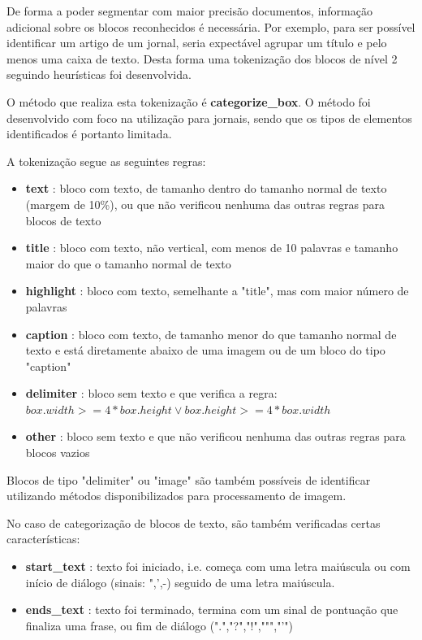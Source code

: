 
\label{contribution_categorize_blocks}

De forma a poder segmentar com maior precisão documentos, informação adicional sobre os blocos reconhecidos é necessária. Por exemplo, para ser possível identificar um artigo de um jornal, seria expectável agrupar um título e pelo menos uma caixa de texto. Desta forma uma tokenização dos blocos de nível 2 seguindo heurísticas foi desenvolvida.

O método que realiza esta tokenização é \textbf{categorize\_box}. O método foi desenvolvido com foco na utilização para jornais, sendo que os tipos de elementos identificados é portanto limitada.

A tokenização segue as seguintes regras:

\begin{itemize}\setlength\itemsep{-0.3em}
	\item \textbf{text} 		: bloco com texto, de tamanho dentro do tamanho normal de texto (margem de 10\%), ou que não verificou nenhuma das outras regras para blocos de texto
	\item \textbf{title} 	: bloco com texto, não vertical, com menos de 10 palavras e tamanho maior do que o tamanho normal de texto
	\item \textbf{highlight} : bloco com texto, semelhante a "title", mas com maior número de palavras
	\item \textbf{caption} 	: bloco com texto, de tamanho menor do que tamanho normal de texto e está diretamente abaixo de uma imagem ou de um bloco do tipo "caption"
	\item \textbf{delimiter} : bloco sem texto e que verifica a regra: $box.width >= 4*box.height \vee box.height >= 4*box.width$
	\item \textbf{other} 	: bloco sem texto e que não verificou nenhuma das outras regras para blocos vazios
\end{itemize}

Blocos de tipo "delimiter" ou "image" são também possíveis de identificar utilizando métodos disponibilizados para processamento de imagem.

No caso de categorização de blocos de texto, são também verificadas certas características:
\begin{itemize}\setlength\itemsep{-0.3em}
	\item \textbf{start\_text} : texto foi iniciado, i.e. começa com uma letra maiúscula ou com início de diálogo (sinais: ",',-) seguido de uma letra maiúscula.
	\item \textbf{ends\_text} : texto foi terminado, termina com um sinal de pontuação que finaliza uma frase, ou fim de diálogo (".","?","!",""","'")
\end{itemize}

